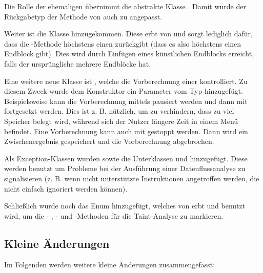 Die Rolle der ehemaligen  übernimmt die abstrakte Klasse .
Damit wurde der Rückgabetyp der Methode  von  auch zu  angepasst.

Weiter ist die Klasse  hinzugekommen.
Diese erbt von  und sorgt lediglich dafür, dass die -Methode höchstens einen  zurückgibt (dass es also höchstens einen Endblock gibt). Dies wird durch Einfügen eines künstlichen Endblocks erreicht, falls der ursprüngliche  mehrere Endblöcke hat.

\newpage
Eine weitere neue Klasse ist , welche die Vorberechnung einer  kontrolliert. Zu diesem Zweck wurde dem Konstruktor ein Parameter vom Typ  hinzugefügt.
Beispielsweise kann die Vorberechnung mittels  pausiert werden und dann mit  fortgesetzt werden.
Dies ist z. B. nützlich, um zu verhindern, dass zu viel Speicher belegt wird, während sich der Nutzer längere Zeit in einem Menü befindet.
Eine Vorberechnung kann auch mit  gestoppt werden.
Dann wird ein Zwischenergebnis gespeichert und die Vorberechnung abgebrochen.

Als Exception-Klassen wurden  sowie die Unterklassen  und  hinzugefügt.
Diese werden benutzt um Probleme bei der Ausführung einer Datenflussanalyse zu signalisieren (z. B. wenn nicht unterstützte Instruktionen angetroffen werden, die nicht einfach ignoriert werden können).

Schließlich wurde noch das Enum  hinzugefügt, welches von  erbt und benutzt wird, um die - , - und -Methoden für die Taint-Analyse zu markieren.

\subsection{Kleine Änderungen}

Im Folgenden werden weitere kleine Änderungen zusammengefasst:

